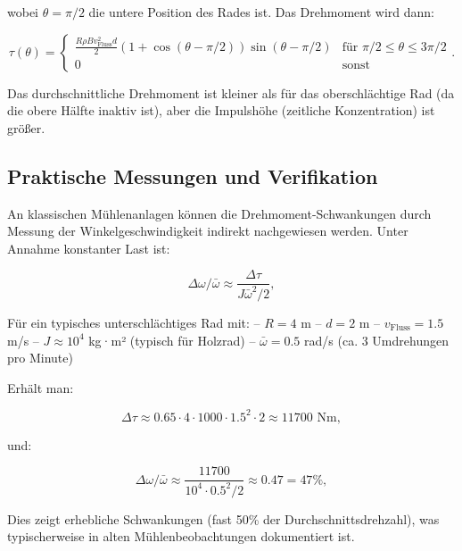 \documentclass[a4paper,12pt]{article}
\theoremstyle{definition}
\begin{document}
\noindent
wobei $\theta = \pi/2$ die untere Position des Rades ist. Das Drehmoment wird dann:

\begin{equation}
  \tau(\theta) = \begin{cases}
    \frac{R\rho B v_\text{Fluss}^2 d}{2}(1+\cos(\theta-\pi/2))\sin(\theta-\pi/2) & \text{für } \pi/2 \leq \theta \leq 3\pi/2 \\
    0 & \text{sonst}
  \end{cases}.
  \label{eq:tau_unterschlaechtig}
\end{equation}

Das durchschnittliche Drehmoment ist kleiner als für das oberschlächtige Rad (da die obere Hälfte inaktiv ist), aber die Impulshöhe (zeitliche Konzentration) ist größer.

\subsection{Praktische Messungen und Verifikation}

An klassischen Mühlenanlagen können die Drehmoment-Schwankungen durch Messung der Winkelgeschwindigkeit indirekt nachgewiesen werden. Unter Annahme konstanter Last ist:

\begin{equation}
  \Delta\omega / \bar{\omega} \approx \frac{\Delta \tau}{J \bar{\omega}^2 / 2},
  \label{eq:delta_omega_approx}
\end{equation}

Für ein typisches unterschlächtiges Rad mit:
-- $R = 4$ m
-- $d = 2$ m
-- $v_\text{Fluss} = 1.5$ m/s
-- $J \approx 10^4$ kg·m² (typisch für Holzrad)
-- $\bar{\omega} = 0.5$ rad/s (ca. 3 Umdrehungen pro Minute)

Erhält man:

\begin{equation}
  \Delta \tau \approx 0.65 \cdot 4 \cdot 1000 \cdot 1.5^2 \cdot 2 \approx 11700 \text{ Nm},
  \label{eq:delta_tau_beispiel}
\end{equation}

\noindent
und:

\begin{equation}
  \Delta\omega / \bar{\omega} \approx \frac{11700}{10^4 \cdot 0.5^2 / 2} \approx 0.47 = 47\%,
  \label{eq:delta_omega_beispiel}
\end{equation}

Dies zeigt erhebliche Schwankungen (fast 50\% der Durchschnittsdrehzahl), was typischerweise in alten Mühlenbeobachtungen dokumentiert ist.
\end{document}

